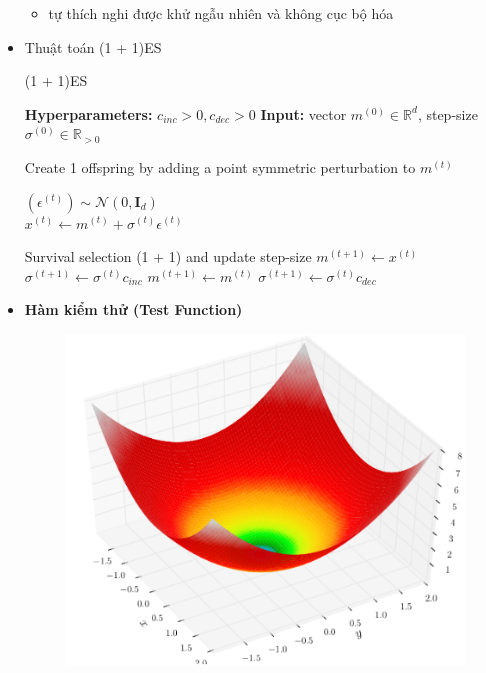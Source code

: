 \documentclass{book}
\begin{document}
\begin{itemize}
    \begin{itemize}[nosep]
        \item tự thích nghi được khử ngẫu nhiên và không cục bộ hóa
    \end{itemize}
    \item Thuật toán (1 + 1)ES
    \begin{algorithm}[]
        \caption{(1 + 1)ES}
        \label{alg:oneplusone_es}
        \begin{algorithmic}[1]
        \STATE \textbf{Hyperparameters:} $c_{inc} > 0, c_{dec} > 0$
        \STATE \textbf{Input:} vector $m^{(0)} \in \mathbb{R}^d$, step-size $\sigma^{(0)} \in \mathbb{R}_{>0}$
        \STATE 
        \vspace{1mm}
            \STATE \parbox[c]{\dimexpr\linewidth-2.5em}{%
            Create 1 offspring by adding a point symmetric perturbation to $m^{(t)}$
            \vspace{0.2em}
            \begin{center}
            $(\epsilon^{(t)}) \sim \mathcal{N}(0, \mathbf{I}_d)$ \\
            $x^{(t)} \leftarrow m^{(t)} + \sigma^{(t)}\epsilon^{(t)}$
            \end{center}
            }
            \STATE Survival selection (1 + 1) and update step-size
                \STATE $m^{(t+1)} \leftarrow x^{(t)}$
                \STATE $\sigma^{(t+1)} \leftarrow \sigma^{(t)}c_{inc}$
            \ELSE
                \STATE $m^{(t+1)} \leftarrow m^{(t)}$
                \STATE $\sigma^{(t+1)} \leftarrow \sigma^{(t)}c_{dec}$
            \ENDIF
        \ENDFOR
        \end{algorithmic}
    \end{algorithm}
    \item \textbf{Hàm kiểm thử (Test Function)}
    \begin{figure}[H]
        \centering
        \begin{minipage}[c]{0.45\textwidth}
            \centering
            \includegraphics[width=\textwidth]{images/sphere_function_3D.png}

\end{minipage}
\end{figure}
\end{itemize}
\end{document}
